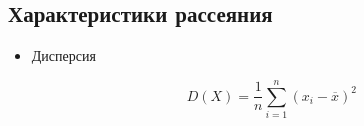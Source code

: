 \subsection{Характеристики рассеяния}
\begin{itemize}
	\item Дисперсия
	
	\begin{equation}\label{disp}
		D(X)=\frac{1}{n}\displaystyle \sum_{i=1}^{n}(x_i-\overline{x})^2
	\end{equation}
	
\end{itemize}
